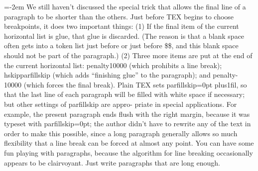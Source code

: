 \hangindent=-2em  We still haven’t discussed the special trick that allows the final line of a paragraph 
to be shorter than the others. Just before TEX begins to choose breakpoints, 
it does two important things: (1) If the final item of the current horizontal
list is glue, that glue is discarded. (The reason is that a blank space often gets into a
token list just before or just before \$\$, and this blank space should not be part
of the paragraph.) (2) Three more items are put at the end of the current horizontal
list: penalty10000 (which prohibits a line break); hskipparfillskip (which adds
“finishing glue” to the paragraph); and penalty-10000 (which forces the final break).
Plain TEX sets parfillskip=0pt plus1fil, so that the last line of each paragraph will
be filled with white space if necessary; but other settings of parfillskip are appro-
priate in special applications. For example, the present paragraph ends flush with the
right margin, because it was typeset with parfillskip=0pt; the author didn’t have to
rewrite any of the text in order to make this possible, since a long paragraph generally
allows so much flexibility that a line break can be forced at almost any point. You
can have some fun playing with paragraphs, because the algorithm for line breaking
occasionally appears to be clairvoyant. Just write paragraphs that are long enough.
\bye

